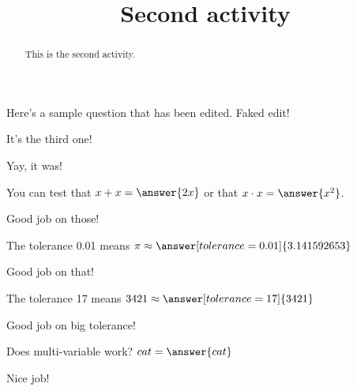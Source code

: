 \documentclass[handout]{ximera}
\title{Second activity}
\begin{document}
\begin{abstract}
This is the second activity.
\end{abstract}


\maketitle

Here's a sample question that has been edited. Faked edit!

\begin{problem}
\begin{multipleChoice}
\end{multipleChoice}
\begin{hint}It's the third one!\end{hint}
\begin{feedback}Yay, it was!\end{feedback}

\begin{problem}
   You can test that $x + x = \answer{2x}$ or that $x \cdot x = \answer{x^2}$.
\begin{feedback}Good job on those!\end{feedback}

\begin{problem}
   The tolerance 0.01 means $\pi \approx \answer[tolerance=0.01]{3.141592653}$
\begin{feedback}Good job on that!\end{feedback}

\begin{problem}
   The tolerance 17 means $3421 \approx \answer[tolerance=17]{3421}$
\begin{feedback}Good job on big tolerance!\end{feedback}

\begin{problem}
Does multi-variable work? $ cat = \answer{cat}$
\begin{feedback}Nice job!\end{feedback}
\end{problem}
\end{problem}
\end{problem}
\end{problem}
\end{problem}
\end{document}
